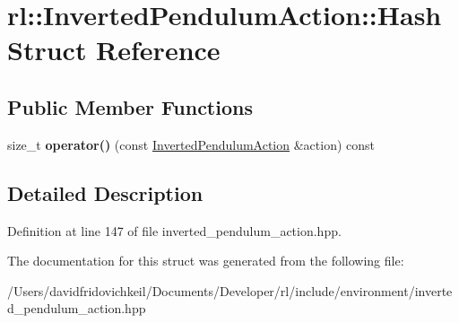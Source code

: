 \hypertarget{structrl_1_1_inverted_pendulum_action_1_1_hash}{}\section{rl\+:\+:Inverted\+Pendulum\+Action\+:\+:Hash Struct Reference}
\label{structrl_1_1_inverted_pendulum_action_1_1_hash}
\subsection*{Public Member Functions}
\begin{DoxyCompactItemize}
\item 
\hypertarget{structrl_1_1_inverted_pendulum_action_1_1_hash_af5513ab239a1fee61024a8abeb0a1c59}{}\label{structrl_1_1_inverted_pendulum_action_1_1_hash_af5513ab239a1fee61024a8abeb0a1c59} 
size\+\_\+t {\bfseries operator()} (const \hyperlink{structrl_1_1_inverted_pendulum_action}{Inverted\+Pendulum\+Action} \&action) const
\end{DoxyCompactItemize}


\subsection{Detailed Description}


Definition at line 147 of file inverted\+\_\+pendulum\+\_\+action.\+hpp.



The documentation for this struct was generated from the following file\+:\begin{DoxyCompactItemize}
\item 
/\+Users/davidfridovichkeil/\+Documents/\+Developer/rl/include/environment/inverted\+\_\+pendulum\+\_\+action.\+hpp\end{DoxyCompactItemize}
